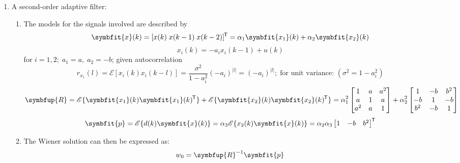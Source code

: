 \documentclass[11pt]{article}
\providecommand{\Vector}[1]{\symbfit{#1}}%
\providecommand{\Matrix}[1]{\symbfup{#1}}%
\newcommand*{\tran}{^{\mkern-1.5mu\mathsf{T}}}
\newcommand\setItemnumber[1]{\setcounter{enumi}{\numexpr#1-1\relax}}  %
\begin{document}
\begin{enumerate}[itemindent= 0pt]
    \setItemnumber{5}
    \item  A second-order adaptive filter:
        \begin{enumerate}[itemindent= -5pt]
            \item The models for the signals involved are described by
                $$ \Vector{x}(k) = [x(k)\; x(k-1)\; x(k-2)]\tran = \alpha_1 \Vector{x_1}(k) + \alpha_2 \Vector{x_2}(k) $$
                $$ x_{i}(k)= -a_{i} x_{i}(k-1)+u(k) $$
                for $i=1,2;\; a_1 = a,\; a_2= -b$; given autocorrelation
                $$
                r_{x_1}(l) = \mathscr{E}\left[x_{i}(k) x_{i}(k-l)\right]=
                \frac{\sigma^{2}}{1-a_{i}^{2}} (-a_{i})^{|l|} = (-a_{i})^{|l|};\;\text{for unit variance: } (\sigma^{2} = 1-a_{i}^{2})
                $$
                $$
                \Matrix{R} = \mathscr{E}\{  \Vector{x_1}(k)  \Vector{x_1}(k)\tran \}
                + \mathscr{E}\{  \Vector{x_2}(k)  \Vector{x_2}(k)\tran \}
                = \alpha_1^2 \begin{bmatrix}
                1 & a & a^2\\
                a & 1 & a  \\
                a^2&a & 1
                \end{bmatrix}
                + \alpha_2^2 \begin{bmatrix}
                1 & -b & b^2\\
                -b & 1 & -b \\
                b^2&-b & 1
                \end{bmatrix}
                $$
                $$\Vector{p} = \mathscr{E} \{  d(k)  \Vector{x}(k) \}
                = \alpha_3 \mathscr{E} \{  x_2(k)  \Vector{x}(k) \}
                = \alpha_2 \alpha_3 \begin{bmatrix}
                1 & -b & b^2
                \end{bmatrix}\tran
                $$
            \item  The Wiener solution can then be expressed as:
            $$
            w_0 = \Matrix{R}^{-1}\Vector{p}
            $$
        \end{enumerate}
\end{enumerate}
\end{document}
